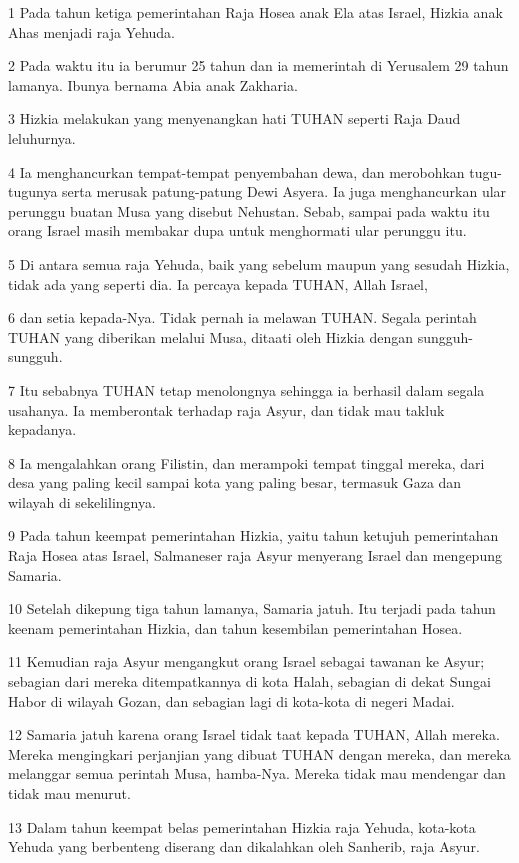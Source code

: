 \par 1 Pada tahun ketiga pemerintahan Raja Hosea anak Ela atas Israel, Hizkia anak Ahas menjadi raja Yehuda.
\par 2 Pada waktu itu ia berumur 25 tahun dan ia memerintah di Yerusalem 29 tahun lamanya. Ibunya bernama Abia anak Zakharia.
\par 3 Hizkia melakukan yang menyenangkan hati TUHAN seperti Raja Daud leluhurnya.
\par 4 Ia menghancurkan tempat-tempat penyembahan dewa, dan merobohkan tugu-tugunya serta merusak patung-patung Dewi Asyera. Ia juga menghancurkan ular perunggu buatan Musa yang disebut Nehustan. Sebab, sampai pada waktu itu orang Israel masih membakar dupa untuk menghormati ular perunggu itu.
\par 5 Di antara semua raja Yehuda, baik yang sebelum maupun yang sesudah Hizkia, tidak ada yang seperti dia. Ia percaya kepada TUHAN, Allah Israel,
\par 6 dan setia kepada-Nya. Tidak pernah ia melawan TUHAN. Segala perintah TUHAN yang diberikan melalui Musa, ditaati oleh Hizkia dengan sungguh-sungguh.
\par 7 Itu sebabnya TUHAN tetap menolongnya sehingga ia berhasil dalam segala usahanya. Ia memberontak terhadap raja Asyur, dan tidak mau takluk kepadanya.
\par 8 Ia mengalahkan orang Filistin, dan merampoki tempat tinggal mereka, dari desa yang paling kecil sampai kota yang paling besar, termasuk Gaza dan wilayah di sekelilingnya.
\par 9 Pada tahun keempat pemerintahan Hizkia, yaitu tahun ketujuh pemerintahan Raja Hosea atas Israel, Salmaneser raja Asyur menyerang Israel dan mengepung Samaria.
\par 10 Setelah dikepung tiga tahun lamanya, Samaria jatuh. Itu terjadi pada tahun keenam pemerintahan Hizkia, dan tahun kesembilan pemerintahan Hosea.
\par 11 Kemudian raja Asyur mengangkut orang Israel sebagai tawanan ke Asyur; sebagian dari mereka ditempatkannya di kota Halah, sebagian di dekat Sungai Habor di wilayah Gozan, dan sebagian lagi di kota-kota di negeri Madai.
\par 12 Samaria jatuh karena orang Israel tidak taat kepada TUHAN, Allah mereka. Mereka mengingkari perjanjian yang dibuat TUHAN dengan mereka, dan mereka melanggar semua perintah Musa, hamba-Nya. Mereka tidak mau mendengar dan tidak mau menurut.
\par 13 Dalam tahun keempat belas pemerintahan Hizkia raja Yehuda, kota-kota Yehuda yang berbenteng diserang dan dikalahkan oleh Sanherib, raja Asyur.
